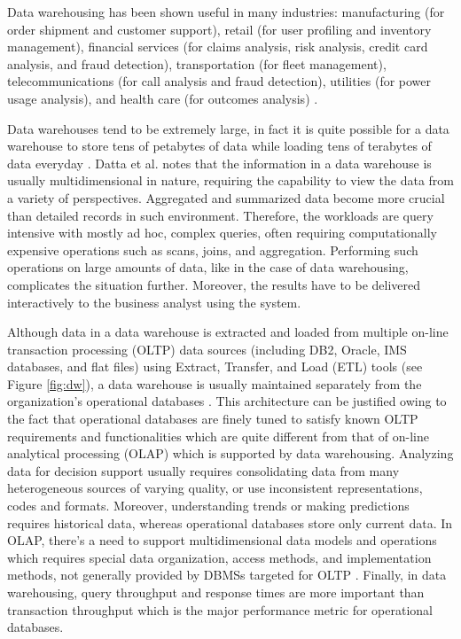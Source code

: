 \documentclass[12pt,a4paper]{article}
\begin{document}
Data warehousing has been shown useful in many industries: manufacturing (for order shipment and customer support), retail (for user profiling and inventory
management), financial services (for claims analysis, risk analysis, credit card analysis, and fraud detection), transportation (for fleet management),
telecommunications (for call analysis and fraud detection), utilities (for power usage analysis), and health care (for outcomes analysis)
\cite{chaudhuri1997overview}.

Data warehouses tend to be extremely large, in fact it is quite possible for a data warehouse to store tens of petabytes of data while loading tens of terabytes
of data everyday \cite{thusoo2010data}. Datta et al. \cite {628286} notes that the information in a data warehouse is usually multidimensional in nature,
requiring the capability to view the data from a variety of perspectives. Aggregated and summarized data become more crucial than detailed records in such
environment. Therefore, the workloads are query intensive with mostly ad hoc, complex queries, often requiring computationally expensive operations such as
scans, joins, and aggregation. Performing such operations on large amounts of data, like in the case of data warehousing, complicates the situation further.
Moreover, the results have to be delivered interactively to the business analyst using the system.


Although data in a data warehouse is extracted and loaded from multiple on-line transaction processing (OLTP) data sources (including DB2, Oracle, IMS
databases, and flat files) using Extract, Transfer, and Load (ETL) tools (see Figure \ref{fig:dw}), a data warehouse is usually maintained separately from the
organization's operational databases \cite{sen2005comparison, chaudhuri1997overview}. This architecture can be justified owing to the fact that operational
databases are finely tuned to satisfy known OLTP requirements and functionalities which are quite different from that of on-line analytical processing (OLAP)
which is supported by data warehousing. Analyzing data for decision support usually requires consolidating data from many heterogeneous sources of varying
quality, or use inconsistent representations, codes and formats. Moreover, understanding trends or making predictions requires historical data, whereas
operational databases store only current data. In OLAP, there's a need to support multidimensional data models and operations which requires special data
organization, access methods, and implementation methods, not generally provided by DBMSs targeted for OLTP \cite{chaudhuri1997overview}. Finally, in data
warehousing, query throughput and response times are more important than transaction throughput which is the major performance metric for operational databases.
\end{document}

